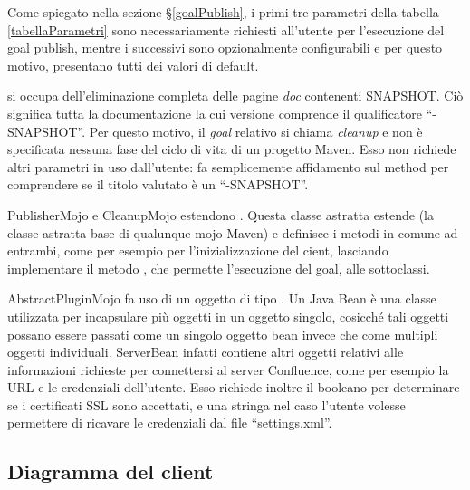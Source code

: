 Come spiegato nella sezione \S\ref{goalPublish}, i primi tre parametri della tabella \ref{tabellaParametri} sono necessariamente richiesti all'utente per l'esecuzione del goal publish, mentre i successivi sono opzionalmente configurabili e per questo motivo, presentano tutti dei valori di default.

 si occupa dell'eliminazione completa delle pagine \emph{doc} contenenti SNAPSHOT.
Ciò significa tutta la documentazione la cui versione comprende il qualificatore ``-SNAPSHOT''.
Per questo motivo, il \emph{goal} relativo si chiama \emph{cleanup} e non è specificata nessuna fase del ciclo di vita di un progetto Maven.
Esso non richiede altri parametri in uso dall'utente: fa semplicemente affidamento sul method  per comprendere se il titolo valutato è un ``-SNAPSHOT''.

PublisherMojo e CleanupMojo estendono .
Questa classe astratta estende  (la classe astratta base di qualunque mojo Maven) e definisce i metodi in comune ad entrambi, come per esempio  per l'inizializzazione del cient, lasciando implementare il metodo , che permette l'esecuzione del goal, alle sottoclassi.

AbstractPluginMojo fa uso di un oggetto di tipo .
Un Java Bean è una classe utilizzata per incapsulare più oggetti in un oggetto singolo, cosicché tali oggetti possano essere passati come un singolo oggetto bean invece che come multipli oggetti individuali.
ServerBean infatti contiene altri oggetti relativi alle informazioni richieste per connettersi al server Confluence, come per esempio la URL e le credenziali dell'utente.
Esso richiede inoltre il booleano  per determinare se i certificati SSL sono accettati, e una stringa  nel caso l'utente volesse permettere di ricavare le credenziali dal file ``settings.xml''.

\subsection{Diagramma del client}

